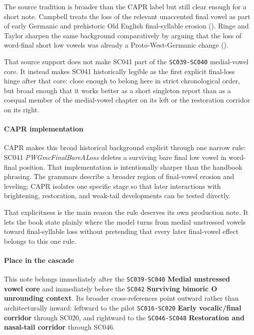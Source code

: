 \documentclass[
  british,
  a4paper,
]{article}
\begin{document}
The source tradition is broader than the CAPR label but still clear
enough for a short note. Campbell treats the loss of the relevant
unaccented final vowel as part of early Germanic and prehistoric Old
English final-syllable erosion (). Ringe and Taylor sharpen the same background
comparatively by arguing that the loss of word-final short low vowels
was already a Proto-West-Germanic change
().

That source support does not make SC041 part of the \texttt{SC039-SC040}
medial-vowel core. It instead makes SC041 historically legible as the
first explicit final-loss hinge after that core: close enough to belong
here in strict chronological order, but broad enough that it works
better as a short singleton report than as a coequal member of the
medial-vowel chapter on its left or the restoration corridor on its
right.

\paragraph{CAPR implementation}\label{capr-implementation-25}

CAPR makes this broad historical background explicit through one narrow
rule: SC041 \emph{PWGmcFinalBareALoss} deletes a surviving bare final
low vowel in word- final position. That implementation is intentionally
sharper than the handbook phrasing. The grammars describe a broader
region of final-vowel erosion and leveling; CAPR isolates one specific
stage so that later interactions with brightening, restoration, and
weak-tail developments can be tested directly.

That explicitness is the main reason the rule deserves its own
production note. It lets the book state plainly where the model turns
from medial unstressed vowels toward final-syllable loss without
pretending that every later final-vowel effect belongs to this one rule.

\paragraph{Place in the cascade}\label{place-in-the-cascade-25}

This note belongs immediately after the \texttt{SC039-SC040}
\textbf{Medial unstressed vowel core} and immediately before the
\texttt{SC042} \textbf{Surviving bimoric O unrounding context}. Its
broader cross-references point outward rather than architecturally
inward: leftward to the pilot \texttt{SC016-SC020} \textbf{Early
vocalic/final corridor} through SC020, and rightward to the
\texttt{SC046-SC048} \textbf{Restoration and nasal-tail corridor}
through SC046.
\end{document}
